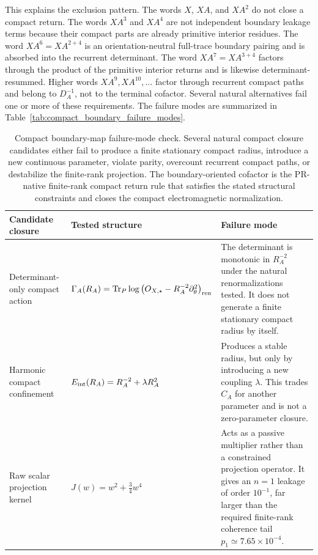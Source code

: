 \documentclass[11pt]{article}
\renewcommand{\arraystretch}{1.22}
\renewcommand{\arraystretch}{1.4}
\begin{document}
This explains the exclusion pattern. The words \(X\), \(XA\), and \(XA^2\) do
not close a compact return. The words \(XA^3\) and \(XA^4\) are not independent
boundary leakage terms because their compact parts are already primitive
interior residues. The word \(XA^6=XA^{2+4}\) is an orientation-neutral
full-trace boundary pairing and is absorbed into the recurrent determinant. The
word \(XA^7=XA^{3+4}\) factors through the product of the primitive interior
returns and is likewise determinant-resummed. Higher words
\(XA^9,XA^{10},\ldots\) factor through recurrent compact paths and belong to
\(D_A^{-1}\), not to the terminal cofactor. Several natural alternatives fail one or more of these requirements. The
failure modes are summarized in Table~\ref{tab:compact_boundary_failure_modes}.

\begin{table}[h]
\centering
\scriptsize
\caption{
Compact boundary-map failure-mode check. Several natural compact closure
candidates either fail to produce a finite stationary compact radius, introduce
a new continuous parameter, violate parity, overcount recurrent compact paths,
or destabilize the finite-rank projection. The boundary-oriented cofactor is
the PR-native finite-rank compact return rule that satisfies the stated
structural constraints and closes the compact electromagnetic normalization.
}

\renewcommand{\arraystretch}{1.22}
\begin{tabular}{p{}p{}p{}}
\hline
\textbf{Candidate closure} & \textbf{Tested structure} & \textbf{Failure mode} \\
\hline

Determinant-only compact action
&
\(\Gamma_A(R_A)=
{\rm Tr}_P\log\left(O_{X,\star}-R_A^{-2}\partial_\theta^2\right)_{\rm ren}\)
&
The determinant is monotonic in \(R_A^{-2}\) under the natural renormalizations
tested. It does not generate a finite stationary compact radius by itself.
\\

Harmonic compact confinement
&
\(E_{\rm int}(R_A)=R_A^{-2}+\lambda R_A^2\)
&
Produces a stable radius, but only by introducing a new coupling \(\lambda\).
This trades \(C_A\) for another parameter and is not a zero-parameter closure.
\\

Raw scalar projection kernel
&
\(J(w)=w^2+\frac34w^4\)
&
Acts as a passive multiplier rather than a constrained projection operator. It
gives an \(n=1\) leakage of order \(10^{-1}\), far larger than the required
finite-rank coherence tail \(p_1\simeq7.65\times10^{-4}\).
\\


\end{tabular}
\end{table}
\end{document}
